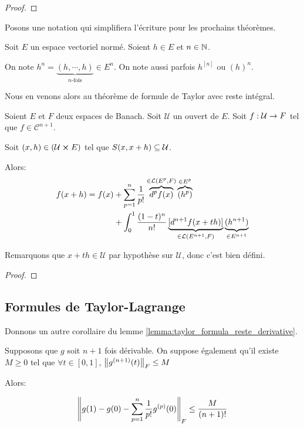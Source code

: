 \ifdefined\outputproof
\begin{proof}

\end{proof}
\fi

Posons une notation qui simplifiera l'écriture pour les prochains théorèmes.

\begin{notation}
	Soit $E$ un espace vectoriel normé. Soient $h \in E$ et $n \in \mathbb{N}$.

	On note $h^{n} = \underbrace{(h, \cdots, h)}_{\text{$n$-fois}} \in E^{n}$.
	On note aussi parfois $h^{[n]}$ ou $(h)^{n}$.
\end{notation}

Nous en venons alors au théorème de formule de Taylor avec reste intégral.

\begin{theorem}
	\label{theorem:taylor_formula_reste_integral}
	Soient $E$ et $F$ deux espaces de Banach. Soit $\mathcal{U}$ un ouvert de
	$E$.
	Soit $f : \mathcal{U} \rightarrow F$ tel que $f \in \mathcal{C}^{n + 1}$.

	Soit $(x, h) \in (\mathcal{U} \cross E)$ tel que $S(x, x + h)
	\subseteq \mathcal{U}$.

	Alors:
	\begin{align*}
		f(x + h) = f(x) & + \displaystyle \sum_{p = 1}^{n} \frac{1}{p!}
		\overbrace{d^{p}f(x)}^{\in \mathcal{L}(E^{p}, F)}
		\overbrace{(h^{p})}^{\in E^{p}} \\
		& + \int_{0}^{1} \frac{(1 - t)^{n}}{n!} \underbrace{[d^{n + 1}f(x +
		th)]}_{\in \mathcal{L}(E^{n+1}, F)} \underbrace{(h^{n+1})}_{\in E^{n +
		1}}
	\end{align*}

	Remarquons que $x + th \in \mathcal{U}$ par hypothèse sur $\mathcal{U}$,
	donc c'est bien défini.
\end{theorem}

\ifdefined\outputproof
\begin{proof}

\end{proof}
\fi

\subsection{Formules de Taylor-Lagrange}

Donnons un autre corollaire du lemme
\ref{lemma:taylor_formula_reste_derivative}.

\begin{corollary}
	Supposons que $g$ soit $n + 1$ fois dérivable.
	On suppose également qu'il existe $M \geq 0$ tel que $\forall t \in [0, 1]$,
	$\norm{g^{(n + 1)}(t)}_{F} \leq M$

	Alors:

	\begin{equation*}
		\norm{g(1) - g(0) - \displaystyle \sum_{p = 1}^{n} \frac{1}{p!}
		g^{(p)}(0)}_{F} \leq \frac{M}{(n + 1)!}
	\end{equation*}
\end{corollary}

